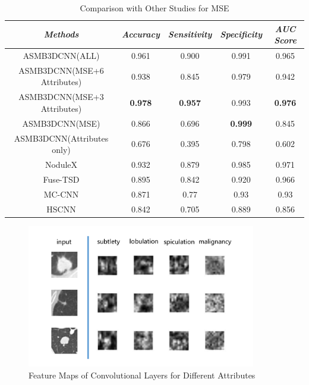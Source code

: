 \documentclass[runningheads]{llncs}
\begin{document}
\begin{table}[htb]
\vspace{-0.5cm}
\caption{Comparison with Other Studies for MSE}
\begin{center}
\begin{tabular}{|c|c|c|c|c|}
\hline

\textbf{\textit{Methods}}& \textbf{\textit{Accuracy}}& \textbf{\textit{Sensitivity}} & \textbf{\textit{Specificity}} & \textbf{\textit{AUC Score}} \\
\hline
ASMB3DCNN(ALL) & 0.961 & 0.900 & 0.991& 0.965\\
ASMB3DCNN(MSE+6 Attributes) &  0.938 &  0.845 & 0.979&  0.942\\
ASMB3DCNN(MSE+3 Attributes) & {\bfseries 0.978} & {\bfseries 0.957} & 0.993& {\bfseries 0.976}\\
ASMB3DCNN(MSE) & 0.866 & 0.696 & {\bfseries 0.999}& 0.845\\
ASMB3DCNN(Attributes only) & 0.676 & 0.395 &  0.798& 0.602\\
NoduleX\cite{Causey2018Highly}& 0.932 & 0.879 & 0.985 & 0.971 \\
Fuse-TSD\cite{Xie2017Fusing}&0.895&0.842&0.920&0.966 \\
MC-CNN\cite{Shen2017Multi}&0.871&0.77& 0.93&0.93\\
HSCNN\cite{shen2019interpretable}&0.842&0.705& 0.889&0.856\\
\hline
\end{tabular}
\label{tab4}
\vspace{-1cm}
\end{center}
\end{table}


\begin{figure}[htb]
\centerline{\includegraphics[width=100mm]{attri.pdf}}
\vspace{-0.5cm}
\caption{Feature Maps of Convolutional Layers for Different Attributes}
\label{attri}
\vspace{-0.5cm}
\end{figure}
\end{document}
